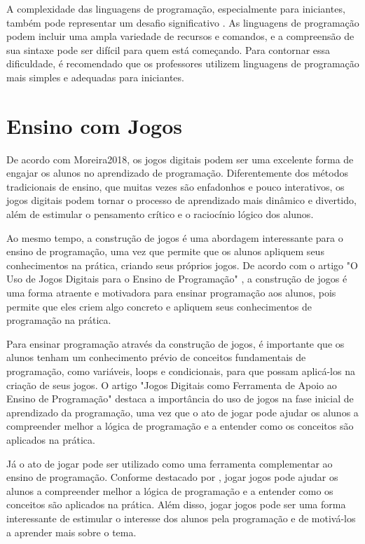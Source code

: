 A complexidade das linguagens de programação, especialmente para iniciantes, também pode representar um desafio significativo \cite{Silva2014}. As linguagens de programação podem incluir uma ampla variedade de recursos e comandos, e a compreensão de sua sintaxe pode ser difícil para quem está começando. Para contornar essa dificuldade, é recomendado que os professores utilizem linguagens de programação mais simples e adequadas para iniciantes.

\section{Ensino com Jogos}

De acordo com {Moreira2018}, os jogos digitais podem ser uma excelente forma de engajar os alunos no aprendizado de programação. Diferentemente dos métodos tradicionais de ensino, que muitas vezes são enfadonhos e pouco interativos, os jogos digitais podem tornar o processo de aprendizado mais dinâmico e divertido, além de estimular o pensamento crítico e o raciocínio lógico dos alunos.

Ao mesmo tempo, a construção de jogos é uma abordagem interessante para o ensino de programação, uma vez que permite que os alunos apliquem seus conhecimentos na prática, criando seus próprios jogos. De acordo com o artigo "O Uso de Jogos Digitais para o Ensino de Programação" \cite{Moreira2018}, a construção de jogos é uma forma atraente e motivadora para ensinar programação aos alunos, pois permite que eles criem algo concreto e apliquem seus conhecimentos de programação na prática.

Para ensinar programação através da construção de jogos, é importante que os alunos tenham um conhecimento prévio de conceitos fundamentais de programação, como variáveis, loops e condicionais, para que possam aplicá-los na criação de seus jogos. O artigo "Jogos Digitais como Ferramenta de Apoio ao Ensino de Programação" \cite{Pereira2016} destaca a importância do uso de jogos na fase inicial de aprendizado da programação, uma vez que o ato de jogar pode ajudar os alunos a compreender melhor a lógica de programação e a entender como os conceitos são aplicados na prática.

Já o ato de jogar pode ser utilizado como uma ferramenta complementar ao ensino de programação. Conforme destacado por \cite{Pereira2016}, jogar jogos pode ajudar os alunos a compreender melhor a lógica de programação e a entender como os conceitos são aplicados na prática. Além disso, jogar jogos pode ser uma forma interessante de estimular o interesse dos alunos pela programação e de motivá-los a aprender mais sobre o tema.

